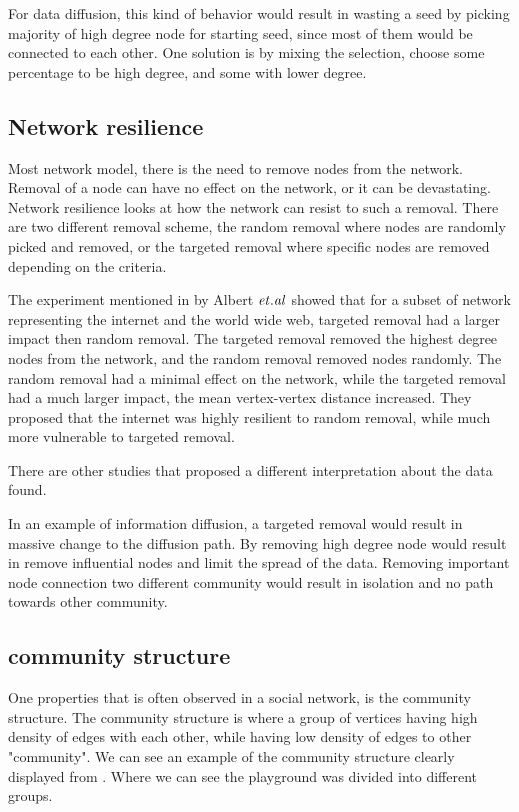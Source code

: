 For data diffusion, this kind of behavior would result in wasting a seed by picking majority of high degree node for starting seed, since most of them would be connected to each other. One solution is by mixing the selection, choose some percentage to be high degree, and some with lower degree.

\subsection{Network resilience}
Most network model, there is the need to remove nodes from the network. Removal of a node can have no effect on the network, or it can be devastating. Network resilience looks at how the network can resist to such a removal. There are two different removal scheme, the random removal where nodes are randomly picked and removed, or the targeted removal where specific nodes are removed depending on the criteria. 

The experiment mentioned in \cite{complexNetwork} by Albert $\it{et. al}$ showed that for a subset of network representing the internet and the world wide web, targeted removal had a larger impact then random removal. The targeted removal removed the highest degree nodes from the network, and the random removal removed nodes randomly. The random removal had a minimal effect on the network, while the targeted removal had a much larger impact, the mean vertex-vertex distance increased. They proposed that the internet was highly resilient to random removal, while much more vulnerable to targeted removal. 

There are other studies that proposed a different interpretation about the data found.	

In an example of information diffusion, a targeted removal would result in massive change to the diffusion path. By removing high degree node would result in remove influential nodes and limit the spread of the data. Removing important node connection two different community would result in isolation and no path towards other community.

\subsection{community structure}
One properties that is often observed in a social network, is the community structure. The community structure is where a group of vertices having high density of edges with each other, while having low density of edges to other "community". We can see an example of the community structure clearly displayed from \cite{RaceSchool2001}. Where we can see the playground was divided into different groups.

